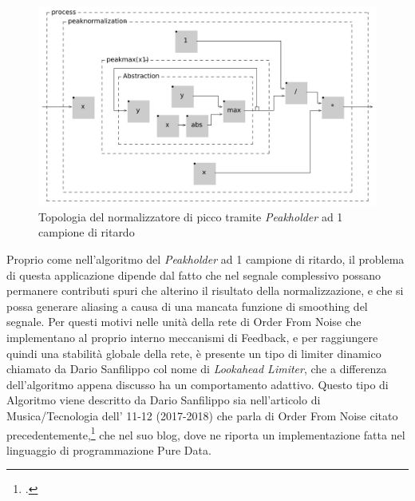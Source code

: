 \begin{figure}[h!]
\begin{center}
    \includegraphics[width=14cm]{figures/PeakNormalizationIIR.pdf}
    \caption {Topologia del normalizzatore di picco tramite \textit{Peakholder} ad 1 campione di ritardo}
\end{center}
\vspace{0.5cm}
\end{figure}
    
Proprio come nell'algoritmo del \textit{Peakholder} ad 1 campione di ritardo, 
il problema di questa applicazione dipende dal fatto che nel segnale
complessivo possano permanere contributi spuri che alterino il risultato
della normalizzazione, e che si possa generare aliasing a causa di una mancata
funzione di smoothing del segnale.
Per questi motivi nelle unità della rete di Order From Noise 
che implementano al proprio interno meccanismi di Feedback,
e per raggiungere quindi una stabilità globale della rete,
è presente un tipo di limiter dinamico chiamato da Dario Sanfilippo
col nome di \textit{Lookahead Limiter}, che a differenza dell'algoritmo
appena discusso ha un comportamento adattivo.
Questo tipo di Algoritmo viene descritto da Dario Sanfilippo sia nell'articolo 
di Musica/Tecnologia dell' 11-12 (2017-2018) che parla di Order From Noise 
citato precedentemente,\footcite{sanfilippo_time-variant_2018}
che nel suo blog, dove ne riporta un implementazione fatta nel linguaggio di programmazione
Pure Data.


